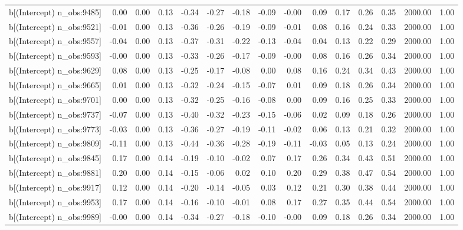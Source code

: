 \begin{table}[ht]
\begin{tabular}{rrrrrrrrrrrrrrr}
  b[(Intercept) n\_obs:9485] & 0.00 & 0.00 & 0.13 & -0.34 & -0.27 & -0.18 & -0.09 & -0.00 & 0.09 & 0.17 & 0.26 & 0.35 & 2000.00 & 1.00 \\ 
  b[(Intercept) n\_obs:9521] & -0.01 & 0.00 & 0.13 & -0.36 & -0.26 & -0.19 & -0.09 & -0.01 & 0.08 & 0.16 & 0.24 & 0.33 & 2000.00 & 1.00 \\ 
  b[(Intercept) n\_obs:9557] & -0.04 & 0.00 & 0.13 & -0.37 & -0.31 & -0.22 & -0.13 & -0.04 & 0.04 & 0.13 & 0.22 & 0.29 & 2000.00 & 1.00 \\ 
  b[(Intercept) n\_obs:9593] & -0.00 & 0.00 & 0.13 & -0.33 & -0.26 & -0.17 & -0.09 & -0.00 & 0.08 & 0.16 & 0.26 & 0.34 & 2000.00 & 1.00 \\ 
  b[(Intercept) n\_obs:9629] & 0.08 & 0.00 & 0.13 & -0.25 & -0.17 & -0.08 & 0.00 & 0.08 & 0.16 & 0.24 & 0.34 & 0.43 & 2000.00 & 1.00 \\ 
  b[(Intercept) n\_obs:9665] & 0.01 & 0.00 & 0.13 & -0.32 & -0.24 & -0.15 & -0.07 & 0.01 & 0.09 & 0.18 & 0.26 & 0.34 & 2000.00 & 1.00 \\ 
  b[(Intercept) n\_obs:9701] & 0.00 & 0.00 & 0.13 & -0.32 & -0.25 & -0.16 & -0.08 & 0.00 & 0.09 & 0.16 & 0.25 & 0.33 & 2000.00 & 1.00 \\ 
  b[(Intercept) n\_obs:9737] & -0.07 & 0.00 & 0.13 & -0.40 & -0.32 & -0.23 & -0.15 & -0.06 & 0.02 & 0.09 & 0.18 & 0.26 & 2000.00 & 1.00 \\ 
  b[(Intercept) n\_obs:9773] & -0.03 & 0.00 & 0.13 & -0.36 & -0.27 & -0.19 & -0.11 & -0.02 & 0.06 & 0.13 & 0.21 & 0.32 & 2000.00 & 1.00 \\ 
  b[(Intercept) n\_obs:9809] & -0.11 & 0.00 & 0.13 & -0.44 & -0.36 & -0.28 & -0.19 & -0.11 & -0.03 & 0.05 & 0.13 & 0.24 & 2000.00 & 1.00 \\ 
  b[(Intercept) n\_obs:9845] & 0.17 & 0.00 & 0.14 & -0.19 & -0.10 & -0.02 & 0.07 & 0.17 & 0.26 & 0.34 & 0.43 & 0.51 & 2000.00 & 1.00 \\ 
  b[(Intercept) n\_obs:9881] & 0.20 & 0.00 & 0.14 & -0.15 & -0.06 & 0.02 & 0.10 & 0.20 & 0.29 & 0.38 & 0.47 & 0.54 & 2000.00 & 1.00 \\ 
  b[(Intercept) n\_obs:9917] & 0.12 & 0.00 & 0.14 & -0.20 & -0.14 & -0.05 & 0.03 & 0.12 & 0.21 & 0.30 & 0.38 & 0.44 & 2000.00 & 1.00 \\ 
  b[(Intercept) n\_obs:9953] & 0.17 & 0.00 & 0.14 & -0.16 & -0.10 & -0.01 & 0.08 & 0.17 & 0.27 & 0.35 & 0.44 & 0.54 & 2000.00 & 1.00 \\ 
  b[(Intercept) n\_obs:9989] & -0.00 & 0.00 & 0.14 & -0.34 & -0.27 & -0.18 & -0.10 & -0.00 & 0.09 & 0.18 & 0.26 & 0.34 & 2000.00 & 1.00 \\ 

\end{tabular}
\end{table}
